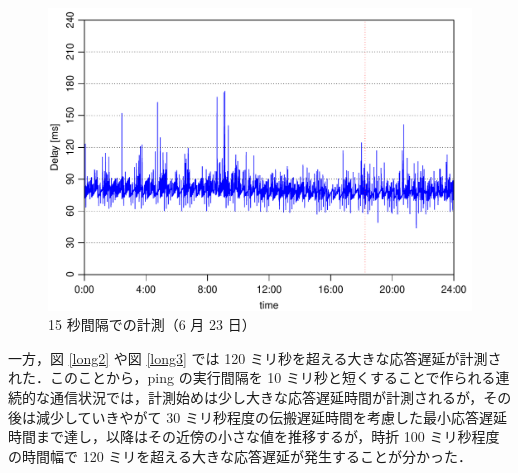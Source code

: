 \documentclass[a4j]{jarticle}
\begin{document}
\begin{figure}[tb]
\centering
\includegraphics[width=0.8\hsize]{../2020-07-08/plot-6-23.pdf}
\caption{15 秒間隔での計測（6 月 23 日）}
\label{6-23}
\end{figure}
一方，図 \ref{long2} や図 \ref{long3} では 120 ミリ秒を超える大きな応答遅延が計測された．このことから，ping の実行間隔を 10 ミリ秒と短くすることで作られる連続的な通信状況では，計測始めは少し大きな応答遅延時間が計測されるが，その後は減少していきやがて 30 ミリ秒程度の伝搬遅延時間を考慮した最小応答遅延時間まで達し，以降はその近傍の小さな値を推移するが，時折 100 ミリ秒程度の時間幅で 120 ミリを超える大きな応答遅延が発生することが分かった．
\end{document}
